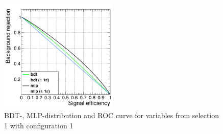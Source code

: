 \documentclass[11pt]{scrartcl}
\begin{document}
\begin{figure}[H]
	\includegraphics[width=0.5\textwidth]{figures/MVA/select1/config1/FOM_selection1_nL5_nT400_mD1_nC10.png}
	\caption{BDT-, MLP-distribution and ROC curve for variables from selection 1 with configuration 1}
	 \label{fig:ROC_s1_config1}
	\end{figure}
	
\end{document}
